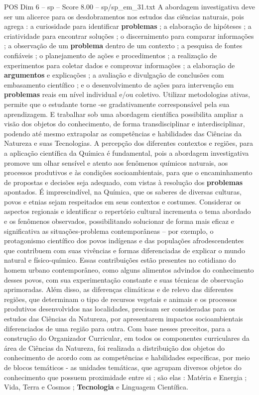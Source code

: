 \begin{textsample}{POS Dim 6 – sp – Score 8.00 – sp/sp\_em\_31.txt}
A abordagem investigativa deve ser um alicerce para os desdobramentos nos estudos das ciências naturais, pois agrega : a curiosidade para identificar \textbf{problemas} ; a elaboração de hipóteses ; a criatividade para encontrar soluções ; o discernimento para comparar informações ; a observação de um \textbf{problema} dentro de um contexto ; a pesquisa de fontes confiáveis ; o planejamento de ações e procedimentos ; a realização de experimentos para coletar dados e comprovar informações ; a elaboração de \textbf{argumentos} e explicações ; a avaliação e divulgação de conclusões com embasamento científico ; e o desenvolvimento de ações para intervenção em \textbf{problemas} reais em nível individual e/ou coletivo.
Utilizar metodologias ativas, permite que o estudante torne -se gradativamente corresponsável pela sua aprendizagem.
E trabalhar sob uma abordagem científica possibilita ampliar a visão dos objetos do conhecimento, de forma transdisciplinar e interdisciplinar, podendo até mesmo extrapolar as competências e habilidades das Ciências da Natureza e suas Tecnologias.
A percepção dos diferentes contextos e regiões, para a aplicação científica da Química é fundamental, pois a abordagem investigativa promove um olhar sensível e atento aos fenômenos químicos naturais, aos processos produtivos e às condições socioambientais, para que o encaminhamento de propostas e decisões seja adequado, com vistas à resolução dos \textbf{problemas} apontados.
É imprescindível, na Química, que os saberes de diversas culturas, povos e etnias sejam respeitados em seus contextos e costumes.
Considerar os aspectos regionais e identificar o repertório cultural incrementa o tema abordado e os fenômenos observados, possibilitando solucionar de forma mais eficaz e significativa as situações-problema contemporâneas – por exemplo, o protagonismo científico dos povos indígenas e das populações afrodescendentes que contribuem com suas vivências e formas diferenciadas de explicar o mundo natural e físico-químico.
Essas contribuições estão presentes no cotidiano do homem urbano contemporâneo, como alguns alimentos advindos do conhecimento desses povos, com sua experimentação constante e suas técnicas de observação aprimoradas.
Além disso, as diferenças climáticas e de relevo das diferentes regiões, que determinam o tipo de recursos vegetais e animais e os processos produtivos desenvolvidos nas localidades, precisam ser consideradas para os estudos das Ciências da Natureza, por apresentarem impactos socioambientais diferenciados de uma região para outra.
Com base nesses preceitos, para a construção do Organizador Curricular, em todos os componentes curriculares da área de Ciências da Natureza, foi realizada a distribuição dos objetos do conhecimento de acordo com as competências e habilidades específicas, por meio de blocos temáticos - as unidades temáticas, que agrupam diversos objetos do conhecimento que possuem proximidade entre si ; são elas : Matéria e Energia ; Vida, Terra e Cosmos ; \textbf{Tecnologia} e Linguagem Científica.

\end{textsample}
